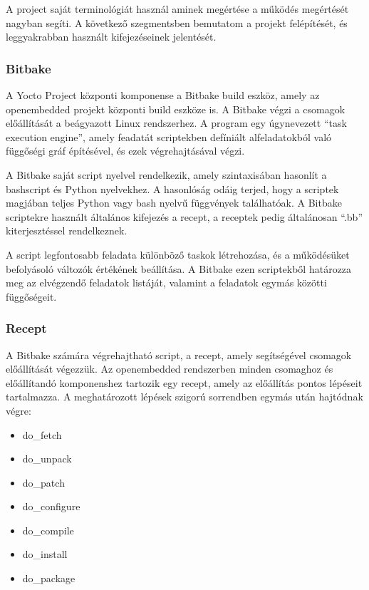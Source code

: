 A project saját terminológiát használ aminek megértése a működés megértését
nagyban segíti. A következő szegmentsben bemutatom a projekt felépítését, és
leggyakrabban használt kifejezéseinek jelentését.

\subsubsection{Bitbake}

A Yocto Project központi komponense a Bitbake build eszköz, amely az openembedded
projekt központi build eszköze is. A Bitbake végzi a csomagok előállítását a
beágyazott Linux rendszerhez.  A program egy úgynevezett ``task execution
engine'', amely feadatát scriptekben defíniált alfeladatokból való függőségi gráf
építésével, és ezek végrehajtásával végzi.

\medskip

A Bitbake saját script nyelvel rendelkezik, amely szintaxisában hasonlít a
bashscript és Python nyelvekhez. A hasonlóság odáig terjed, hogy a scriptek
magjában teljes Python vagy bash nyelvű függvények találhatóak. A Bitbake
scriptekre használt általános kifejezés a recept, a receptek pedig általánosan
``.bb'' kiterjesztéssel rendelkeznek.

A script legfontosabb feladata különböző taskok létrehozása, és a működésüket
befolyásoló változók értékének beállítása. A Bitbake ezen scriptekből határozza
meg az elvégzendő feladatok listáját, valamint a feladatok egymás közötti
függőségeit. 

\subsubsection{Recept}

A Bitbake számára végrehajtható script, a recept, amely segítségével csomagok
előállítását végezzük. Az openembedded rendszerben minden csomaghoz és
előállítandó komponenshez tartozik egy recept, amely az előállítás pontos
lépéseit tartalmazza. A meghatározott lépések szigorú sorrendben egymás után
hajtódnak végre:

\begin{itemize}
  \setlength\itemsep{0em}
\item{do\_fetch}
\item{do\_unpack}
\item{do\_patch}
\item{do\_configure}
\item{do\_compile}
\item{do\_install}
\item{do\_package}
\end{itemize}

